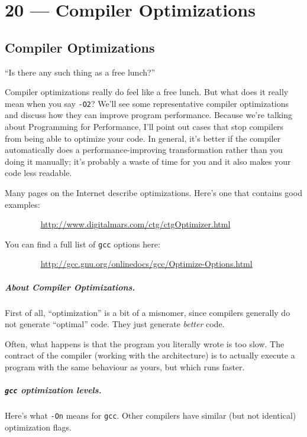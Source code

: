 \documentclass[a4paper]{report}
\begin{document}
\chapter*{20 --- Compiler Optimizations}


\section*{Compiler Optimizations}

\hfill ``Is there any such thing as a free lunch?''

Compiler optimizations really do feel like a free lunch.
But what does it really mean when you say {\tt -O2}?
We'll see some representative compiler optimizations and discuss how
they can improve program performance. Because we're talking about
Programming for Performance, I'll point out cases that stop compilers
from being able to optimize your code. In general, it's better if the
compiler automatically does a performance-improving transformation
rather than you doing it manually; it's probably a waste of time for
you and it also makes your code less readable.

Many pages on the Internet describe
optimizations. Here's one that contains good examples:

$\qquad \qquad$ \url{http://www.digitalmars.com/ctg/ctgOptimizer.html}

You can find a full list of {\tt gcc} options here:

$\qquad \qquad$ \url{http://gcc.gnu.org/onlinedocs/gcc/Optimize-Options.html}

\paragraph{About Compiler Optimizations.} First of all, ``optimization'' is
a bit of a misnomer, since compilers generally do not generate ``optimal'' code.
They just generate \emph{better} code.

Often, what happens is that the program you literally wrote is too slow. The
contract of the compiler (working with the architecture) is to actually execute
a program with the same behaviour as yours, but which runs faster.

\paragraph{{\tt gcc} optimization levels.} Here's what {\tt -On} means for
{\tt gcc}. Other compilers have similar (but not identical) optimization flags.
\end{document}
